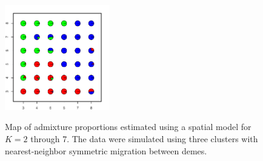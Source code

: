 \documentclass[12pt]{article}
\begin{document}
\begin{figure}
			{\includegraphics[width=1.8in,height=1.8in]{figs/sims/simK3_sp_pies_K7.pdf}}
	\caption{
	Map of admixture proportions estimated using a spatial model for $K=2$ through 7.
	The data were simulated using three clusters with nearest-neighbor symmetric migration between demes.
    }\label{simK3_sp_pies}
\end{figure}

\newpage
\clearpage


\newpage

\end{document}
